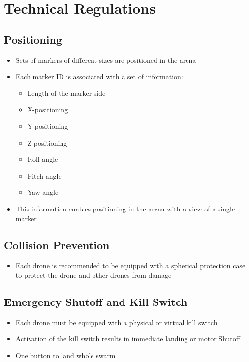 \section{Technical Regulations}


\subsection{Positioning}
\begin{itemize}
	\item Sets of markers of different sizes are positioned in the arena
	\item Each marker ID is associated with a set of information:
\begin{itemize}
	\item Length of the marker side
	\item X-positioning
	\item Y-positioning
	\item Z-positioning
	\item Roll angle
	\item Pitch angle
	\item Yaw angle
\end{itemize}

\item This information enables positioning in the arena with a view of a single marker
\end{itemize}

\subsection{Collision Prevention}
\begin{itemize}
	\item{Each drone is recommended to be equipped with a spherical protection case to protect the drone and other drones from damage}
\end{itemize}

\subsection{Emergency Shutoff and Kill Switch}
\begin{itemize}
	\item Each drone must be equipped with a physical or virtual kill switch.
	\item Activation of the kill switch results in immediate landing or motor Shutoff
	\item One button to land whole swarm
\end{itemize}


